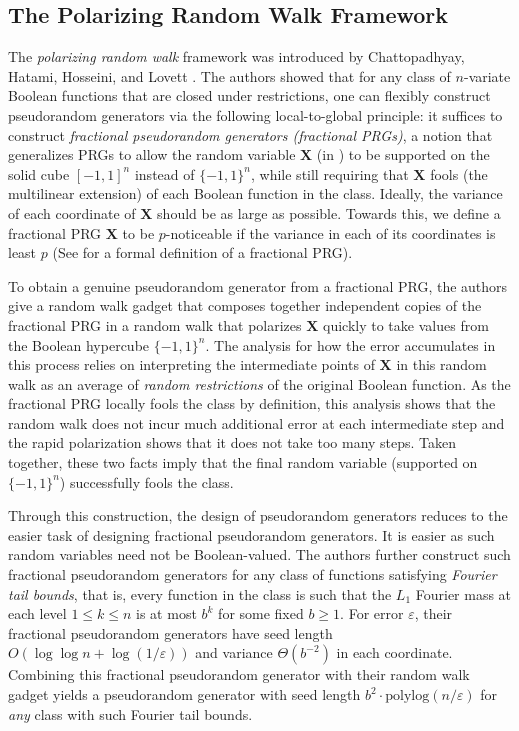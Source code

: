 \documentclass[10pt,a4paper]{article}
\newcommand{\eps}{\varepsilon}
\theoremstyle{definition}
\begin{document}
\subsection{The Polarizing Random Walk Framework} \label{intro:polarize}
The \emph{polarizing random walk} framework was introduced by Chattopadhyay, Hatami, Hosseini, and Lovett \cite{CHHL}. 
The authors showed that for any class of $n$-variate Boolean functions that are closed under restrictions, one can flexibly construct pseudorandom generators via the following local-to-global principle: it suffices to construct \emph{fractional pseudorandom generators (fractional PRGs)}, a notion that generalizes PRGs to allow the random variable $\mathbf{X}$ (in ) to be supported on the solid cube $[-1,1]^n$ instead of $\{-1,1\}^n$, while still requiring that $\mathbf{X}$ fools (the multilinear extension) of each Boolean function in the class.
Ideally, the variance of each coordinate of $\mathbf{X}$ should be as large as possible.  
Towards this,  we define a fractional PRG $\mathbf{X}$ to be $p$-noticeable if the variance in each of its coordinates is least $p$ (See  for a formal definition of a fractional PRG).

To obtain a genuine pseudorandom generator from a fractional PRG,
the authors give a random walk gadget that composes together independent copies of the fractional PRG in a random walk that polarizes  $\mathbf{X}$ quickly to take values from the Boolean hypercube $\{-1,1\}^n$.
The analysis for how the error accumulates in this process relies on interpreting the intermediate points of $\mathbf{X}$ in this 
random walk as an average of \emph{random restrictions} of the original Boolean function. As the fractional PRG locally fools the class by definition, this analysis shows that the random walk does not incur much additional error at each intermediate step and the rapid polarization shows that it does not take too many steps.  Taken together, these two facts imply that the final random variable (supported on  $\{-1,1\}^n$) successfully fools the class. 

 
Through this construction, the design of pseudorandom generators reduces to the easier task of designing fractional pseudorandom generators.
It is easier as such random variables need not be Boolean-valued.
 The authors further construct such fractional pseudorandom generators for any class of functions satisfying \emph{Fourier tail bounds}, that is, every function in the class is such that the $L_1$ Fourier mass at each level $1\leq k\leq n$ is at most $b^k$ for some fixed $b\geq 1$.
 For error $\eps$, their fractional pseudorandom generators have seed length $O(\log\log n+ \log(1/\eps))$ and variance $\Theta(b^{-2})$ in each coordinate.  Combining this fractional pseudorandom generator with their random walk gadget yields a pseudorandom generator with seed length $b^2\cdot \mathrm{polylog}(n/\eps)$ for \emph{any} class with such Fourier tail bounds. 
\end{document}
